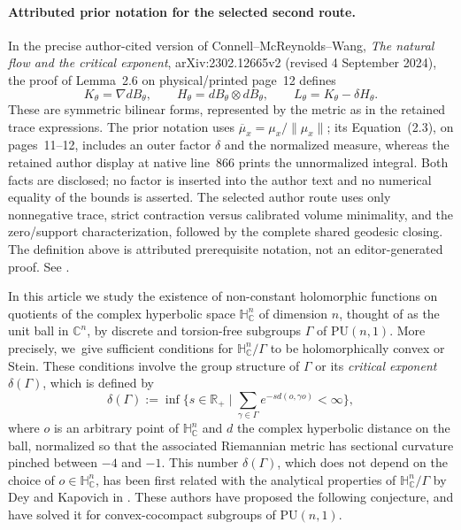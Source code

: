 \documentclass[11pt]{article}
\let\ts\textstyle
\theoremstyle{definition}
\newcommand{\C}{\mathbb{C}}
\newcommand{\R}{\mathbb{R}}
\newcommand{\HNC}{\mathbb{H}^{n}_{\C}}
\newcommand{\PU}{\mathrm{PU}}
\def\C{\mathbb{C}}
\newcommand{\HNC}{\mathbb{H}^{n}_{\C}}
\newcommand{\PU}{\mathrm{PU}}
\begin{document}
\paragraph{Attributed prior notation for the selected second route.}
In the precise author-cited version of Connell--McReynolds--Wang,
\emph{The natural flow and the critical exponent}, arXiv:2302.12665v2
(revised 4 September 2024), the proof of Lemma~2.6 on physical/printed page~12 defines
\[
 K_\theta=\nabla dB_\theta,\qquad
 H_\theta=dB_\theta\otimes dB_\theta,\qquad
 L_\theta=K_\theta-\delta H_\theta.
\]
These are symmetric bilinear forms, represented by the metric as in the retained
trace expressions. The prior notation uses
$\overline{\mu}_x=\mu_x/\lVert\mu_x\rVert$;
its Equation~(2.3), on pages~11--12, includes an outer factor $\delta$ and the normalized
measure, whereas the retained author display at native line~866 prints the unnormalized
integral. Both facts are disclosed; no factor is inserted into the author text and no
numerical equality of the bounds is asserted. The selected author route uses only
nonnegative trace, strict contraction versus calibrated volume minimality, and the
zero/support characterization, followed by the complete shared geodesic closing.
The definition above is attributed prerequisite notation, not an editor-generated proof.
See \cite[proof of Lemma~2.6 and Equation~(2.3)]{connellNaturalFlowCritical2023}.


\clearpage

In this article we study the existence of non-constant holomorphic functions on quotients of the complex hyperbolic space $\HNC$ of dimension $n$, thought of as the unit ball in $\C^{n}$, by discrete and torsion-free subgroups $\Gamma$ of $\PU(n,1)$. More precisely, we~give sufficient conditions for $\HNC/\Gamma$ to be holomorphically convex or Stein. These conditions involve the group structure of $\Gamma$ or its \textit{critical exponent} $\delta(\Gamma)$, which is defined by\begin{equation}\label{eq-def-delta}
\delta(\Gamma):= \ts\inf \bigl\{s \in \R_{+} \mid \sum_{\gamma \in \Gamma}e^{-sd(o,\gamma o)}< \infty\bigr\},
\end{equation}
where $o$ is an arbitrary point of $\HNC$ and $d$ the complex hyperbolic distance on the ball, normalized so that the associated Riemannian metric has sectional curvature pinched between $-4$ and $-1$. This number $\delta(\Gamma)$, which does not depend on the choice of $o\in \HNC$, has been first related with the analytical properties of $\HNC/\Gamma$ by Dey and Kapovich in \cite{deyNoteComplexhyperbolicKleinian2020}. These authors have proposed the following conjecture, and have solved it for convex-cocompact subgroups of $\PU(n,1)$.
\end{document}
